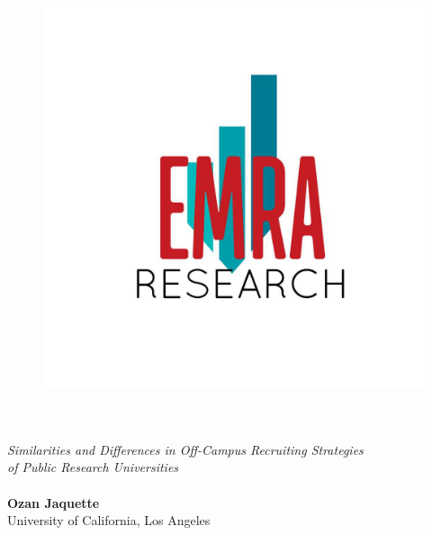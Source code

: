 \documentclass[twoside]{article}
\begin{document}




\begin{titlepage}

    \begin{figure}
        \includegraphics[width=.25\textwidth, right]{images/emra.jpg}
        \vspace{-1.1cm}
    \end{figure}

    \begin{mdframed}[backgroundcolor=LightBlue, linecolor=LightBlue, innerbottommargin=1.2cm]

        \centering\color{white}\fontsize{30}{60}

        \vspace{3cm}
         \\

        \vspace{0.8cm}
        \textbf{\color{LightPink}{OH, THE PLACES THEY'LL GO}} \\

        \vspace{0.6cm}
        \large\textit{Similarities and Differences in Off-Campus Recruiting Strategies \\ of Public Research Universities} \\

        \vspace{0.4cm}
         \\

        \vspace{10cm}
        \textbf{Ozan Jaquette} \\
        University of California, Los Angeles \\~\\
        \textit{\color{Gray}{Oct 2018}}

    \end{mdframed}
\end{titlepage}
\end{document}
